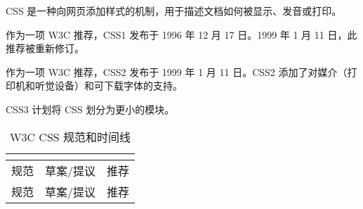 CSS 是一种向网页添加样式的机制，用于描述文档如何被显示、发音或打印。

作为一项 W3C 推荐，CSS1 发布于 1996 年 12 月 17 日。1999 年 1 月 11 日，此推荐被重新修订。

作为一项 W3C 推荐，CSS2 发布于 1999 年 1 月 11 日。CSS2 添加了对媒介（打印机和听觉设备）和可下载字体的支持。

CSS3 计划将 CSS 划分为更小的模块。

\begin{longtable}{|p{180pt}|p{90pt}|p{90pt}|}
\multicolumn{3}{r}{}
\tabularnewline\hline
规范	& 草案/提议	&推荐
\endhead

\caption{W3C CSS 规范和时间线}\\
\hline
规范	& 草案/提议	&推荐
\endfirsthead

\multicolumn{3}{r}{}
\endfoot


\end{longtable}
